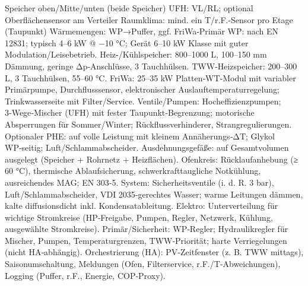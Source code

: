 \markdownRendererUlItem Speicher oben/Mitte/unten (beide Speicher)\markdownRendererUlItemEnd 
\markdownRendererUlItem UFH: VL/RL; optional Oberflächensensor am Verteiler\markdownRendererUlItemEnd 
\markdownRendererUlItem Raumklima: mind. ein T/r.F.-Sensor pro Etage (Taupunkt)\markdownRendererUlItemEnd 
\markdownRendererUlItem Wärmemengen: WP→Puffer, ggf. FriWa‑Primär\markdownRendererUlItemEnd 
\markdownRendererUlEndTight \markdownRendererInterblockSeparator
{}
\markdownRendererSectionEnd \markdownRendererSectionBegin
{}\markdownRendererInterblockSeparator
{}\markdownRendererUlBeginTight
\markdownRendererUlItem WP: nach EN 12831; typisch 4–6 kW @ −10 °C; Gerät 6–10 kW Klasse mit guter Modulation/Leisebetrieb.\markdownRendererUlItemEnd 
\markdownRendererUlItem Heiz-/Kühlspeicher: 800–1000 L, 100–150 mm Dämmung, geringe Δp‑Anschlüsse, 3 Tauchhülsen.\markdownRendererUlItemEnd 
\markdownRendererUlItem TWW‑Heizspeicher: 200–300 L, 3 Tauchhülsen, 55–60 °C.\markdownRendererUlItemEnd 
\markdownRendererUlItem FriWa: 25–35 kW Platten‑WT‑Modul mit variabler Primärpumpe, Durchflusssensor, elektronischer Auslauftemperaturregelung; Trinkwasserseite mit Filter/Service.\markdownRendererUlItemEnd 
\markdownRendererUlItem Ventile/Pumpen: Hocheffizienzpumpen; 3‑Wege‑Mischer (UFH) mit fester Taupunkt‑Begrenzung; motorische Absperrungen für Sommer/Winter; Rückflussverhinderer, Strangregulierungen.\markdownRendererUlItemEnd 
\markdownRendererUlItem Optionaler PHE: auf volle Leistung mit kleinem Annäherungs‑ΔT; Glykol WP‑seitig; Luft/Schlammabscheider.\markdownRendererUlItemEnd 
\markdownRendererUlItem Ausdehnungsgefäße: auf Gesamtvolumen ausgelegt (Speicher + Rohrnetz + Heizflächen).\markdownRendererUlItemEnd 
\markdownRendererUlEndTight \markdownRendererInterblockSeparator
{}
\markdownRendererSectionEnd \markdownRendererSectionBegin
{}\markdownRendererInterblockSeparator
{}\markdownRendererUlBeginTight
\markdownRendererUlItem Ofenkreis: Rücklaufanhebung (≥ 60 °C), thermische Ablaufsicherung, schwerkrafttaugliche Notkühlung, ausreichendes MAG; EN 303‑5.\markdownRendererUlItemEnd 
\markdownRendererUlItem System: Sicherheitsventile (i. d. R. 3 bar), Luft/Schlammabscheider, VDI 2035‑gerechtes Wasser; warme Leitungen dämmen, kalte diffusionsdicht inkl. Kondensatableitung.\markdownRendererUlItemEnd 
\markdownRendererUlItem Elektro: Unterverteilung für wichtige Stromkreise (HP‑Freigabe, Pumpen, Regler, Netzwerk, Kühlung, ausgewählte Stromkreise).\markdownRendererUlItemEnd 
\markdownRendererUlEndTight \markdownRendererInterblockSeparator
{}
\markdownRendererSectionEnd \markdownRendererSectionBegin
{}\markdownRendererInterblockSeparator
{}\markdownRendererUlBeginTight
\markdownRendererUlItem Primär/Sicherheit: WP‑Regler; Hydraulikregler für Mischer, Pumpen, Temperaturgrenzen, TWW‑Priorität; harte Verriegelungen (nicht HA‑abhängig).\markdownRendererUlItemEnd 
\markdownRendererUlItem Orchestrierung (HA): PV‑Zeitfenster (z. B. TWW mittags), Saisonumschaltung, Meldungen (Ofen, Filterservice, r.F./T‑Abweichungen), Logging (Puffer, r.F., Energie, COP‑Proxy).\markdownRendererUlItemEnd 
\markdownRendererUlEndTight 
\markdownRendererSectionEnd 
\markdownRendererSectionEnd \markdownRendererDocumentEnd